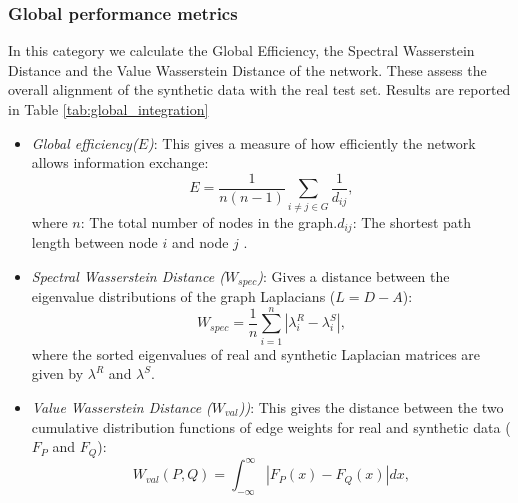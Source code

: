 \documentclass[sigconf, review]{acmart}
\begin{document}
\subsubsection{Global performance metrics} In this category we calculate the Global Efficiency, the Spectral Wasserstein Distance and the Value Wasserstein Distance of the network. These assess the overall alignment of the synthetic data with the real test set. Results are reported in Table \ref{tab:global_integration}
\begin{itemize}
    \item \textit{Global efficiency($E$)}: This gives a measure of how efficiently the network allows information exchange:
    \begin{equation}
        E = \frac{1}{n(n-1)} \sum_{i \neq j \in G} \frac{1}{d_{ij}} ,
    \end{equation}
     where $n$: The total number of nodes in the graph.$d_{ij}$: The shortest path length between node $i$ and node $j$ \cite{PhysRevLett.87.198701}.
     
    \item \textit{Spectral Wasserstein Distance ($W_{spec}$)}: Gives a distance between the eigenvalue distributions of the graph Laplacians ($L = D - A$):
    \begin{equation}
        W_{spec} = \frac{1}{n} \sum_{i=1}^{n} |\lambda_i^R - \lambda_i^S| ,
    \end{equation}
    where the sorted eigenvalues of real and synthetic Laplacian matrices are given by $\lambda^R$ and $\lambda^S$.
    
    \item \textit{Value Wasserstein Distance ($W_{val}$))}: This gives the distance between the two cumulative distribution functions of edge weights for real and synthetic data ($F_P$ and $F_Q$):
    \begin{equation}
        W_{val}(P, Q) = \int_{-\infty}^{\infty} |F_P(x) - F_Q(x)| dx ,
    \end{equation}
\end{itemize}
\end{document}
